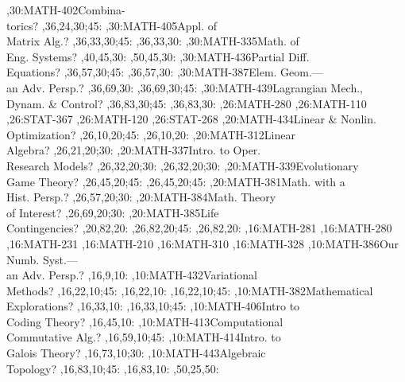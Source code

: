 \documentclass{article}
\begin{document}
\begin{chart}
,30:{MATH-402}{Combina-\\torics}{?}
  ,36,24,30;45:
,30:{MATH-405}{Appl. of\\Matrix Alg.}{?}
  ,36,33,30;45:
  ,36,33,30:
,30:{MATH-335}{Math. of\\Eng. Systems}{?}
  ,40,45,30:
  ,50,45,30:
,30:{MATH-436}{Partial Diff.\\Equations}{?}
  ,36,57,30;45:
  ,36,57,30:
,30:{MATH-387}{Elem. Geom.---\\an Adv. Persp.}{?}
  ,36,69,30:
  ,36,69,30;45:
,30:{MATH-439}{Lagrangian Mech.,\\Dynam. \& Control}{?}
  ,36,83,30;45:
  ,36,83,30:
,26:{MATH-280}
,26:{MATH-110}
,26:{STAT-367}
,26:{MATH-120}
,26:{STAT-268}
,20:{MATH-434}{Linear \& Nonlin.\\Optimization}{?}
  ,26,10,20;45:
  ,26,10,20:
,20:{MATH-312}{Linear\\Algebra}{?}
  ,26,21,20;30:
,20:{MATH-337}{Intro. to Oper.\\Research Models}{?}
  ,26,32,20;30:
  ,26,32,20;30:
,20:{MATH-339}{Evolutionary\\Game Theory}{?}
  ,26,45,20;45:
  ,26,45,20;45:
,20:{MATH-381}{Math. with a\\Hist. Persp.}{?}
  ,26,57,20;30:
,20:{MATH-384}{Math. Theory\\of Interest}{?}
  ,26,69,20;30:
,20:{MATH-385}{Life\\Contingencies}{?}
  ,20,82,20:
  ,26,82,20;45:
  ,26,82,20:
,16:{MATH-281}
,16:{MATH-280}
,16:{MATH-231}
,16:{MATH-210}
,16:{MATH-310}
,16:{MATH-328}
,10:{MATH-386}{Our Numb. Syst.---\\an Adv. Persp.}{?}
  ,16,9,10:
,10:{MATH-432}{Variational\\Methods}{?}
  ,16,22,10;45:
  ,16,22,10:
  ,16,22,10;45:
,10:{MATH-382}{Mathematical\\Explorations}{?}
  ,16,33,10:
  ,16,33,10;45:
,10:{MATH-406}{Intro to\\Coding Theory}{?}
  ,16,45,10:
,10:{MATH-413}{Computational\\Commutative Alg.}{?}
  ,16,59,10;45:
,10:{MATH-414}{Intro. to\\Galois Theory}{?}
  ,16,73,10;30:
,10:{MATH-443}{Algebraic\\Topology}{?}
  ,16,83,10;45:
  ,16,83,10:
  ,50,25,50:
\end{chart}
\end{document}
